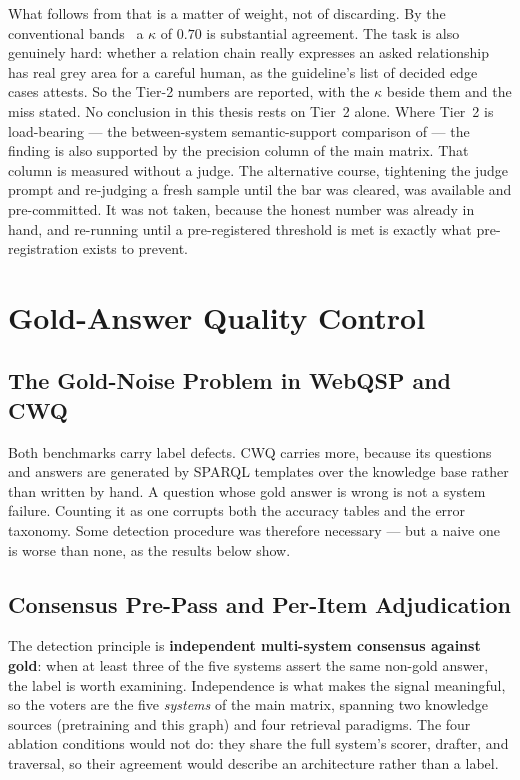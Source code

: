 What follows from that is a matter of weight, not of discarding. By the
conventional bands~\cite{landis1977measurement} a $\kappa$ of $0.70$ is
substantial agreement. The task is also genuinely hard: whether a relation
chain really expresses an asked relationship has real grey area for a careful
human, as the guideline's list of decided edge cases attests. So the Tier-2
numbers are reported, with the $\kappa$ beside them and the miss stated. No
conclusion in this thesis rests on Tier~2 alone. Where Tier~2 is load-bearing
--- the between-system semantic-support comparison of
 --- the finding is also supported by the
precision column of the main matrix. That column is measured without a judge.
The alternative course, tightening the judge prompt and re-judging a fresh
sample until the bar was cleared, was available and pre-committed. It was not
taken, because the honest number was already in hand, and re-running until a
pre-registered threshold is met is exactly what pre-registration exists to
prevent.

\section{Gold-Answer Quality Control}\label{sec:gold-quality}

\subsection{The Gold-Noise Problem in WebQSP and CWQ}

Both benchmarks carry label defects. CWQ carries more, because its
questions and answers are generated by SPARQL templates over
the knowledge base rather than written by hand. A question whose gold answer is
wrong is not a system failure. Counting it as one corrupts both the accuracy
tables and the error taxonomy. Some detection procedure was therefore necessary
--- but a naive one is worse than none, as the results below show.

\subsection{Consensus Pre-Pass and Per-Item Adjudication}

The detection principle is \textbf{independent multi-system consensus against
gold}: when at least three of the five systems assert the same non-gold answer,
the label is worth examining. Independence is what makes the signal meaningful,
so the voters are the five \emph{systems} of the main matrix, spanning two
knowledge sources (pretraining and this graph) and four retrieval paradigms. The
four ablation conditions would not do: they share the full system's scorer,
drafter, and traversal, so their agreement would describe an architecture rather
than a label.

